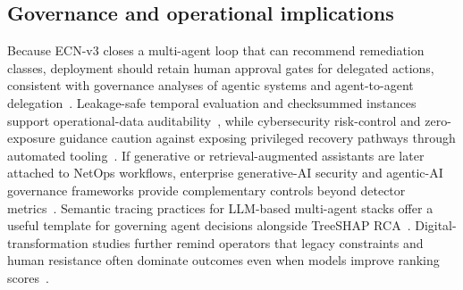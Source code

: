 \subsection{Governance and operational implications}
Because ECN-v3 closes a multi-agent loop that can recommend remediation classes, deployment should retain human approval gates for delegated actions, consistent with governance analyses of agentic systems and agent-to-agent delegation~\cite{rah2026agenticreview,rah2026masreview,rah2026a2a}. Leakage-safe temporal evaluation and checksummed instances support operational-data auditability~\cite{rah2026auditing}, while cybersecurity risk-control and zero-exposure guidance caution against exposing privileged recovery pathways through automated tooling~\cite{rah2026cybercontrols,rah2026zeroexposure}. If generative or retrieval-augmented assistants are later attached to NetOps workflows, enterprise generative-AI security and agentic-AI governance frameworks provide complementary controls beyond detector metrics~\cite{rah2026entgenai,rah2026raggovernance}. Semantic tracing practices for LLM-based multi-agent stacks offer a useful template for governing agent decisions alongside TreeSHAP RCA~\cite{rah2026semantictracing}. Digital-transformation studies further remind operators that legacy constraints and human resistance often dominate outcomes even when models improve ranking scores~\cite{rah2026dtbeyond,rah2026dtfails,rah2026govresistance,rah2026govdtcyber}.
